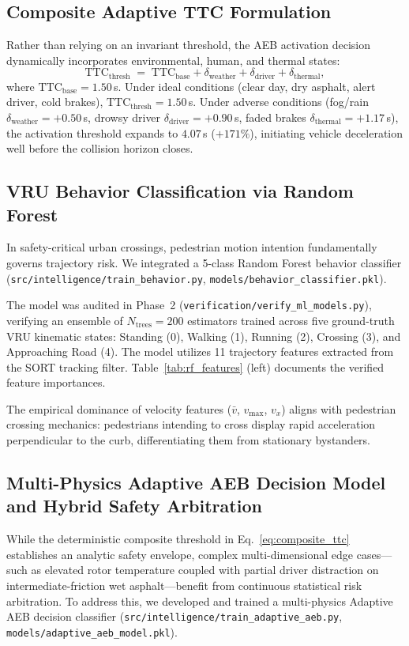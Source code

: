 \documentclass[3p,twocolumn]{elsarticle}
\begin{document}
\subsection{Composite Adaptive TTC Formulation}
Rather than relying on an invariant threshold, the AEB activation decision dynamically incorporates environmental, human, and thermal states:
\begin{equation}
  \text{TTC}_{\text{thresh}} \;=\; \text{TTC}_{\text{base}} + \delta_{\text{weather}} + \delta_{\text{driver}} + \delta_{\text{thermal}},
  \label{eq:composite_ttc}
\end{equation}
where $\text{TTC}_{\text{base}} = 1.50$\,s. Under ideal conditions (clear day, dry asphalt, alert driver, cold brakes), $\text{TTC}_{\text{thresh}} = 1.50$\,s. Under adverse conditions (fog/rain $\delta_{\text{weather}} = +0.50$\,s, drowsy driver $\delta_{\text{driver}} = +0.90$\,s, faded brakes $\delta_{\text{thermal}} = +1.17$\,s), the activation threshold expands to $4.07$\,s ($+171\%$), initiating vehicle deceleration well before the collision horizon closes.

\subsection{VRU Behavior Classification via Random Forest}
In safety-critical urban crossings, pedestrian motion intention fundamentally governs trajectory risk. We integrated a 5-class Random Forest behavior classifier (\texttt{src/intelligence/train\_behavior.py}, \texttt{models/behavior\_classifier.pkl}). 

The model was audited in Phase~2 (\texttt{verification/verify\_ml\_models.py}), verifying an ensemble of $N_{\text{trees}} = 200$ estimators trained across five ground-truth VRU kinematic states: Standing (0), Walking (1), Running (2), Crossing (3), and Approaching Road (4). The model utilizes 11 trajectory features extracted from the SORT tracking filter. Table~\ref{tab:rf_features} (left) documents the verified feature importances.

The empirical dominance of velocity features ($\bar{v}$, $v_{\text{max}}$, $v_x$) aligns with pedestrian crossing mechanics: pedestrians intending to cross display rapid acceleration perpendicular to the curb, differentiating them from stationary bystanders.

\subsection{Multi-Physics Adaptive AEB Decision Model and Hybrid Safety Arbitration}
While the deterministic composite threshold in Eq.~\eqref{eq:composite_ttc} establishes an analytic safety envelope, complex multi-dimensional edge cases---such as elevated rotor temperature coupled with partial driver distraction on intermediate-friction wet asphalt---benefit from continuous statistical risk arbitration. To address this, we developed and trained a multi-physics Adaptive AEB decision classifier (\texttt{src/intelligence/train\_adaptive\_aeb.py}, \texttt{models/adaptive\_aeb\_model.pkl}).
\end{document}
